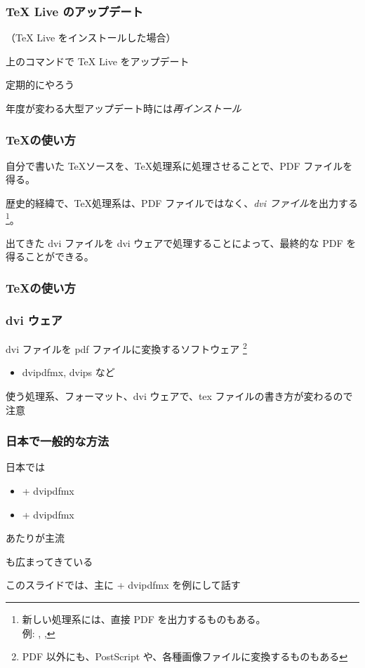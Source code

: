 \begin{frame}
	\frametitle{{\TeX} Live のアップデート}
	（{\TeX} Live をインストールした場合）


	上のコマンドで {\TeX} Live をアップデート

	定期的にやろう

	年度が変わる大型アップデート時には\emph{再インストール}
\end{frame}

\begin{frame}
	\frametitle{\TeX の使い方}
	自分で書いた \TeX ソースを、\TeX 処理系に処理させることで、PDF ファイルを得る。\par
	\pause
	\par
	\pause
	歴史的経緯で、\TeX 処理系は、PDF ファイルではなく、\emph{dvi ファイル}を出力する
	\footnote{新しい処理系には、直接 PDF を出力するものもある。\\例: \pdfTeX, \LuaTeX, \XeTeX}。

	出てきた dvi ファイルを dvi ウェアで処理することによって、最終的な PDF を得ることができる。
\end{frame}

\begin{frame}
	\frametitle{\TeX の使い方}
	\centering
\end{frame}

\begin{frame}
	\frametitle{dvi ウェア}
	dvi ファイルを pdf ファイルに変換するソフトウェア
	\footnote{PDF 以外にも、PostScript や、各種画像ファイルに変換するものもある}
	\begin{itemize}
		\item dvipdfmx, dvips など
	\end{itemize}

	使う処理系、フォーマット、dvi ウェアで、tex ファイルの書き方が変わるので注意
\end{frame}

\begin{frame}
	\frametitle{日本で一般的な方法}
	日本では
	\begin{itemize}
		\item {\pLaTeX} + dvipdfmx
		\item {\upLaTeX} + dvipdfmx
	\end{itemize}
	あたりが主流

	\LuaLaTeX も広まってきている

	\pause
	このスライドでは、主に {\pLaTeX} + dvipdfmx を例にして話す
\end{frame}

